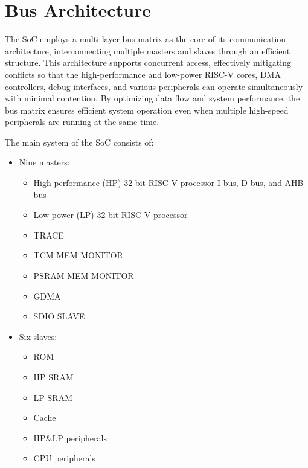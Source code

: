 \documentclass[main\_\_EN.tex]{subfiles}
\begin{document}

\ifglobal
\else
    \listoftodos
    {\let\clearpage\relax \listofdonetodos}
    \tableofcontents
\fi



\hypertarget{busarch}{}
\chapter{Bus Architecture}
\label{mod:busarch}

The \chipname{} SoC employs a multi-layer bus matrix as the core of its communication architecture, interconnecting multiple masters and slaves through an efficient structure. This architecture supports concurrent access, effectively mitigating conflicts so that the high-performance and low-power RISC-V cores, DMA controllers, debug interfaces, and various peripherals can operate simultaneously with minimal contention. By optimizing data flow and system performance, the bus matrix ensures efficient system operation even when multiple high-speed peripherals are running at the same time.

The main system of the \chipname{} SoC consists of:

\begin{itemize}
    \item Nine masters:
        \begin{itemize}
            \item High-performance (HP) 32-bit RISC-V processor I-bus, D-bus, and AHB bus
            \item Low-power (LP) 32-bit RISC-V processor
            \item TRACE
            \item TCM MEM MONITOR
            \item PSRAM MEM MONITOR
            \item GDMA
            \item SDIO SLAVE
        \end{itemize}
    \item Six slaves:
        \begin{itemize}
            \item ROM
            \item HP SRAM
            \item LP SRAM
            \item Cache
            \item HP\&LP peripherals
            \item CPU peripherals
        \end{itemize}
\end{itemize}
\end{document}
